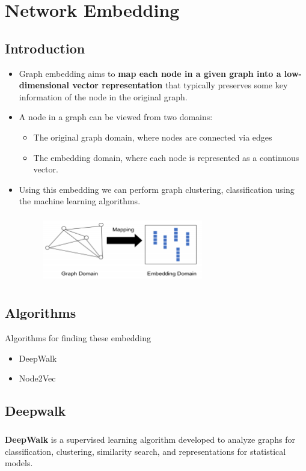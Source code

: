 \chapter{Network Embedding}


\section{Introduction}
\begin{itemize}
    \item Graph embedding aims to \textbf{map each node in a given graph into a low-dimensional vector representation} that typically preserves some key information of the node in the original graph.
    \item A node in a graph can be viewed from two domains:
    \begin{itemize}
        \item The original graph domain, where nodes are connected via edges
        \item The embedding domain, where each node is represented as a continuous vector.
    \end{itemize}
    \item Using this embedding we can perform graph clustering, classification using the machine learning algorithms.
    \begin{figure}[h] 
        \centering
        \includegraphics[height=3cm, width=7cm]{tex/img/Embedding.png} 
    \end{figure}
\end{itemize}
\section{Algorithms}
    Algorithms for finding these embedding
    \begin{itemize}
        \item DeepWalk
        \item Node2Vec
    \end{itemize}
\newpage
\section{Deepwalk}
\paragraph{}\textbf{DeepWalk} is a supervised learning algorithm developed to analyze graphs for classification, clustering, similarity search, and representations for statistical models.
